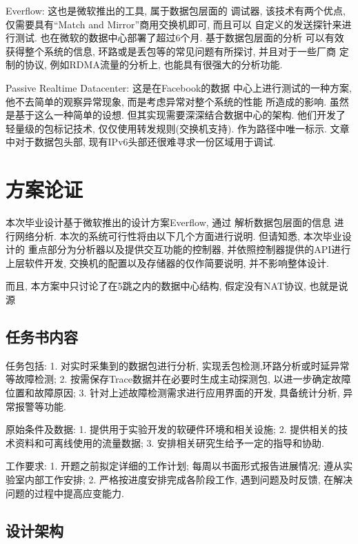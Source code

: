 {\begin{mdframed}[everyline=true]
Everflow:  这也是微软推出的工具,
属于数据包层面的 调试器, 该技术有两个优点, 仅需要具有``Match and
Mirror''商用交换机即可, 而且可以 自定义的发送探针来进行测试.
也在微软的数据中心部署了超过6个月. 基于数据包层面的分析
可以有效获得整个系统的信息, 环路或是丢包等的常见问题有所探讨,
并且对于一些厂商 定制的协议, 例如RDMA流量的分析上,
也能具有很强大的分析功能.

Passive Realtime Datacenter:  这是在Facebook的数据
中心上进行测试的一种方案, 他不去简单的观察异常现象,
而是考虑异常对整个系统的性能 所造成的影响. 虽然是基于这么一种简单的设想.
但其实现需要深深结合数据中心的架构. 他们开发了轻量级的包标记技术,
仅仅使用转发规则(交换机支持). 作为路径中唯一标示. 文章中对于数据包头部,
现有IPv6头部还很难寻求一份区域用于调试.

\section{方案论证}

本次毕业设计基于微软推出的设计方案Everflow,
通过 解析数据包层面的信息 进行网络分析.
本次的系统可行性将由以下几个方面进行说明. 但请知悉, 本次毕业设计的
重点部分为分析器以及提供交互功能的控制器,
并依照控制器提供的API进行上层软件开发,
交换机的配置以及存储器的仅作简要说明, 并不影响整体设计.

而且, 本方案中只讨论了在5跳之内的数据中心结构, 假定没有NAT协议,
也就是说源

\subsection{任务书内容}

任务包括: 1. 对实时采集到的数据包进行分析,
实现丢包检测,环路分析或时延异常等故障检测; 2.
按需保存Trace数据并在必要时生成主动探测包,
以进一步确定故障位置和故障原因; 3.
针对上述故障检测需求进行应用界面的开发, 具备统计分析, 异常报警等功能.

原始条件及数据: 1. 提供用于实验开发的软硬件环境和相关设施; 2.
提供相关的技术资料和可离线使用的流量数据; 3.
安排相关研究生给予一定的指导和协助.

工作要求: 1. 开题之前拟定详细的工作计划; 每周以书面形式报告进展情况;
遵从实验室内部工作安排; 2. 严格按进度安排完成各阶段工作,
遇到问题及时反馈, 在解决问题的过程中提高应变能力.

\subsection{设计架构}


\end{mdframed}}
